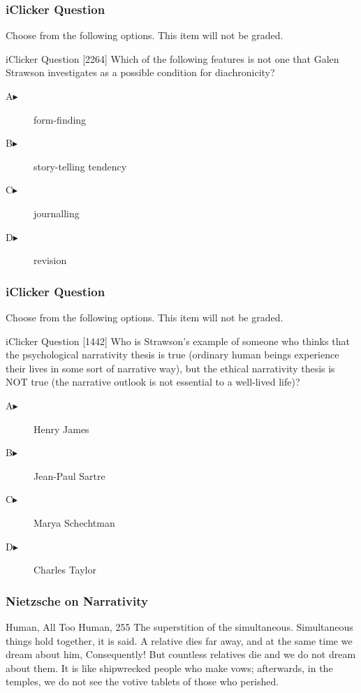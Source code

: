 \documentclass[xcolor=dvipsnames]{beamer}
\begin{document}
\begin{frame}
  \frametitle{iClicker Question}
Choose from the following options. This item will not be graded.
\begin{block}{iClicker Question}
[2264] Which of the following features is not one that Galen Strawson
investigates as a possible condition for diachronicity?
\end{block}
\begin{description}
\item[A\hspace{.2in}$\blacktriangleright$] form-finding
\item[B\hspace{.2in}$\blacktriangleright$] story-telling tendency
\item[C\hspace{.2in}$\blacktriangleright$] journalling
\item[D\hspace{.2in}$\blacktriangleright$] revision
\end{description}
\end{frame}

\begin{frame}
  \frametitle{iClicker Question}
Choose from the following options. This item will not be graded.
\begin{block}{iClicker Question}
[1442] Who is Strawson's example of someone who thinks that the psychological
narrativity thesis is true (ordinary human beings experience their
lives in some sort of narrative way), but the ethical narrativity
thesis is NOT true (the narrative outlook is not essential to a
well-lived life)?
\end{block}
\begin{description}
\item[A\hspace{.2in}$\blacktriangleright$] Henry James
\item[B\hspace{.2in}$\blacktriangleright$] Jean-Paul Sartre
\item[C\hspace{.2in}$\blacktriangleright$] Marya Schechtman
\item[D\hspace{.2in}$\blacktriangleright$] Charles Taylor
\end{description}
\end{frame}

\begin{frame}
  \frametitle{Nietzsche on Narrativity}
  \begin{block}{Human, All Too Human, 255}
    The superstition of the simultaneous. Simultaneous things hold
    together, it is said. A relative dies far away, and at the same
    time we dream about him, Consequently! But countless relatives die
    and we do not dream about them. It is like shipwrecked people who
    make vows; afterwards, in the temples, we do not see the votive
    tablets of those who perished. 
  \end{block}
\end{frame}
\end{document}
